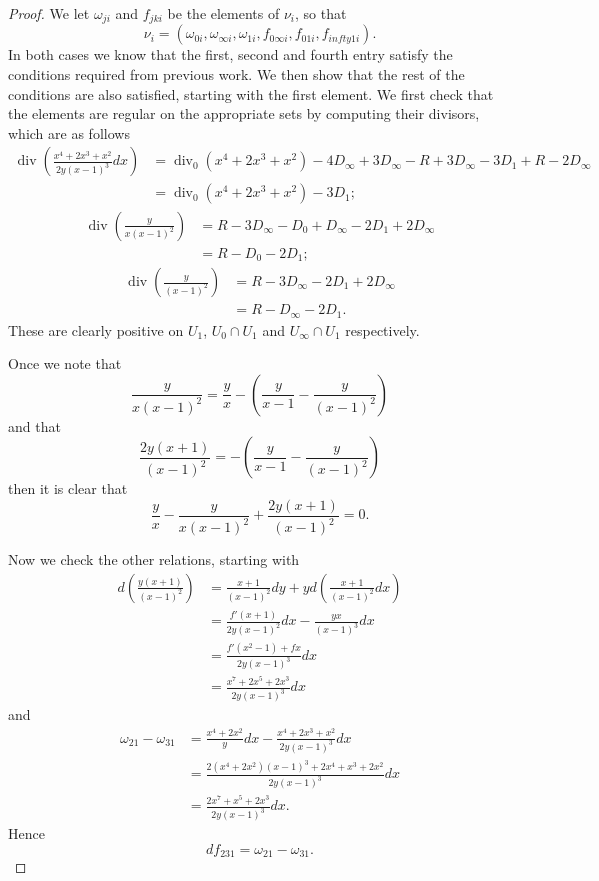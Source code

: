 \documentclass[draft, 11pt]{article} %
\theoremstyle{plain}
\theoremstyle{remark}
\DeclareMathOperator{\di}{div}
\begin{document}
\begin{proof}
We let $\omega_{ji}$ and $f_{jki}$ be the elements of $\nu_i$, so that
\[
\nu_i = (\omega_{0i}, \omega_{\infty i}, \omega_{1i}, f_{0\infty i}, f_{01i}, f_{infty 1 i} ).
\]
In both cases we know that the first, second and fourth entry satisfy the conditions required from previous work.
We then show that the rest of the conditions are also satisfied, starting with the first element.
We first check that the elements are regular on the appropriate sets by computing their divisors, which are as follows
\begin{align}
\di \left( \frac{x^4 + 2x^3 + x^2}{2y(x-1)^3}dx \right) & = \di_0(x^4 + 2x^3 + x^2) - 4D_\infty + 3D_\infty - R +3D_\infty -3D_1 +R - 2D_\infty \\& = \di_0(x^4 + 2x^3 + x^2) - 3D_1;
\end{align}
\begin{align}
\di \left(\frac{y}{x(x-1)^2} \right) & = R - 3D_\infty - D_0 + D_\infty - 2D_1 + 2D_\infty \\
& = R - D_0 - 2D_1;
\end{align}
\begin{align}
\di \left( \frac{y}{(x-1)^2} \right) & = R - 3D_\infty - 2D_1 + 2D_\infty \\
& = R - D_\infty - 2D_1.
\end{align}
These are clearly positive on $U_1$, $U_0 \cap U_1$ and $U_\infty \cap U_1$ respectively.

Once we note that 
\[
\frac{y}{x(x-1)^2} = \frac{y}{x} -\left(\frac{y}{x-1} - \frac{y}{(x-1)^2} \right)
\]
and that
\[
\frac{2y(x+1)}{(x-1)^2} = -\left( \frac{y}{x-1} - \frac{y}{(x-1)^2}\right)
\]
then it is clear that
\[
\frac{y}{x} - \frac{y}{x(x-1)^2} + \frac{2y(x+1)}{(x-1)^2} = 0.
\]

Now we check the other relations, starting with
\begin{align}
d \left( \frac{y(x+1)}{(x-1)^2} \right) & = \frac{x+1}{(x-1)^2}dy + y d \left( \frac{x+1}{(x-1)^2}dx \right) \\
& = \frac{f'(x+1)}{2y(x-1)^2}dx - \frac{yx}{(x-1)^3} dx \\
& = \frac{f'(x^2-1) +fx}{2y(x-1)^3}dx \\
& = \frac{x^7 + 2x^5 + 2x^3}{2y(x-1)^3}dx
\end{align}
and
\begin{align}
\omega_{21} - \omega_{31} & = \frac{x^4 + 2x^2}{y}dx - \frac{x^4 + 2x^3 + x^2}{2y(x-1)^3} dx \\
& = \frac{2(x^4 + 2x^2)(x-1)^3 + 2x^4 + x^3 + 2x^2}{2y(x-1)^3}dx \\
& = \frac{2x^7 + x^5 + 2x^3}{2y(x-1)^3}dx.
\end{align}
Hence 
\[
df_{231} = \omega_{21} - \omega_{31}.
\]


\end{proof}
\end{document}
